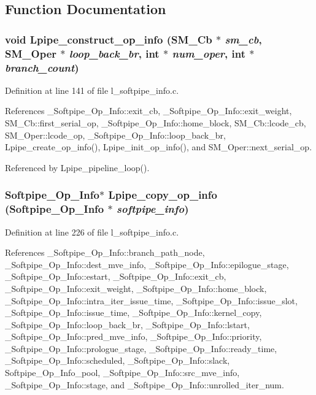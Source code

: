\subsection{Function Documentation}
\subsubsection{\setlength{\rightskip}{0pt plus 5cm}void Lpipe\_\-construct\_\-op\_\-info (\bf{SM\_\-Cb} $\ast$ {\em sm\_\-cb}, \bf{SM\_\-Oper} $\ast$ {\em loop\_\-back\_\-br}, int $\ast$ {\em num\_\-oper}, int $\ast$ {\em branch\_\-count})}\label{l__softpipe__info_8c_8d0bf852772189f5c84753f7efa2f4e4}




Definition at line 141 of file l\_\-softpipe\_\-info.c.

References \_\-Softpipe\_\-Op\_\-Info::exit\_\-cb, \_\-Softpipe\_\-Op\_\-Info::exit\_\-weight, SM\_\-Cb::first\_\-serial\_\-op, \_\-Softpipe\_\-Op\_\-Info::home\_\-block, SM\_\-Cb::lcode\_\-cb, SM\_\-Oper::lcode\_\-op, \_\-Softpipe\_\-Op\_\-Info::loop\_\-back\_\-br, Lpipe\_\-create\_\-op\_\-info(), Lpipe\_\-init\_\-op\_\-info(), and SM\_\-Oper::next\_\-serial\_\-op.

Referenced by Lpipe\_\-pipeline\_\-loop().
\subsubsection{\setlength{\rightskip}{0pt plus 5cm}\bf{Softpipe\_\-Op\_\-Info}$\ast$ Lpipe\_\-copy\_\-op\_\-info (\bf{Softpipe\_\-Op\_\-Info} $\ast$ {\em softpipe\_\-info})}\label{l__softpipe__info_8c_115fd1055670ac5193d46e9e10a2a9f4}




Definition at line 226 of file l\_\-softpipe\_\-info.c.

References \_\-Softpipe\_\-Op\_\-Info::branch\_\-path\_\-node, \_\-Softpipe\_\-Op\_\-Info::dest\_\-mve\_\-info, \_\-Softpipe\_\-Op\_\-Info::epilogue\_\-stage, \_\-Softpipe\_\-Op\_\-Info::estart, \_\-Softpipe\_\-Op\_\-Info::exit\_\-cb, \_\-Softpipe\_\-Op\_\-Info::exit\_\-weight, \_\-Softpipe\_\-Op\_\-Info::home\_\-block, \_\-Softpipe\_\-Op\_\-Info::intra\_\-iter\_\-issue\_\-time, \_\-Softpipe\_\-Op\_\-Info::issue\_\-slot, \_\-Softpipe\_\-Op\_\-Info::issue\_\-time, \_\-Softpipe\_\-Op\_\-Info::kernel\_\-copy, \_\-Softpipe\_\-Op\_\-Info::loop\_\-back\_\-br, \_\-Softpipe\_\-Op\_\-Info::lstart, \_\-Softpipe\_\-Op\_\-Info::pred\_\-mve\_\-info, \_\-Softpipe\_\-Op\_\-Info::priority, \_\-Softpipe\_\-Op\_\-Info::prologue\_\-stage, \_\-Softpipe\_\-Op\_\-Info::ready\_\-time, \_\-Softpipe\_\-Op\_\-Info::scheduled, \_\-Softpipe\_\-Op\_\-Info::slack, Softpipe\_\-Op\_\-Info\_\-pool, \_\-Softpipe\_\-Op\_\-Info::src\_\-mve\_\-info, \_\-Softpipe\_\-Op\_\-Info::stage, and \_\-Softpipe\_\-Op\_\-Info::unrolled\_\-iter\_\-num.

